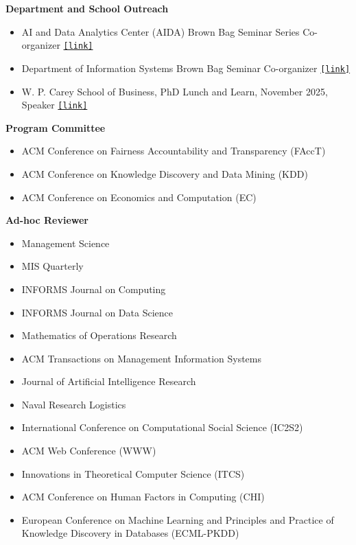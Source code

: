 \documentclass[margin]{res}
\newcommand{\field}[2]{\noindent \textbf{#1} \hfill #2 \\}
\newcommand{\specialurl}[2]{\href {#2} {\mbox{{\texttt{[#1]}}}}\hspace{0pt}}
\newcommand{\link}[1]{\specialurl {link} {#1}}
\begin{document}
\begin{resume}
	\field{Department and School Outreach}{}{
	\vspace{-2em}
	\begin{itemize}[nosep]
		\item[--] AI and Data Analytics Center (AIDA) Brown Bag Seminar Series Co-organizer \link{https://sites.google.com/asu.edu/aida-brownbag-seminar-series}
		\item[--] Department of Information Systems Brown Bag Seminar Co-organizer \link{https://sites.google.com/asu.edu/asuisbrownbagseminarseries}
		\item[--] W. P. Carey School of Business, PhD Lunch and Learn, November 2025, Speaker \link{https://papachristoumarios.github.io/outreach/phd_lunch_and_learn_building_online_presence_nov_2025.pdf}
	\end{itemize}
	}
	\field{Program Committee}{}{
	\vspace{-2em}
	\begin{itemize}[nosep]
		\item[--] ACM Conference on Fairness Accountability and Transparency (FAccT)
		\item[--] ACM Conference on Knowledge Discovery and Data Mining (KDD)
		\item[--] ACM Conference on Economics and Computation (EC)
	\end{itemize}}
	\field{Ad-hoc Reviewer}{}{ 
	\vspace{-2em}
	\begin{itemize}[nosep]
		\item[--] Management Science
		\item[--] MIS Quarterly
		\item[--] INFORMS Journal on Computing
		\item[--] INFORMS Journal on Data Science
		\item[--] Mathematics of Operations Research
		\item[--] ACM Transactions on Management Information Systems
		\item[--] Journal of Artificial Intelligence Research	\item[--] Naval Research Logistics 
		\item[--] International Conference on Computational Social Science (IC2S2)
		\item[--] ACM Web Conference (WWW) 
		\item[--] Innovations in Theoretical Computer Science (ITCS) 		\item[--] ACM Conference on Human Factors in Computing (CHI) 
		\item[--] European Conference on Machine Learning and Principles and Practice of Knowledge Discovery in Databases (ECML-PKDD) 

\end{itemize}}
\end{resume}
\end{document}
